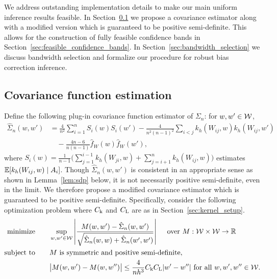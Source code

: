 We address outstanding implementation details to make our main uniform
inference results feasible. In Section~\ref{sec:covariance_estimation} we
propose a covariance estimator along with a modified version which is
guaranteed to be positive semi-definite. This allows for the construction of
fully feasible confidence bands in Section~\ref{sec:feasible_confidence_bands}.
In Section~\ref{sec:bandwidth_selection} we discuss bandwidth selection and
formalize our procedure for robust bias correction inference.

\subsection{Covariance function estimation}
\label{sec:covariance_estimation}

Define the following plug-in covariance function
estimator of $\Sigma_n$: for $w, w' \in \mathcal{W}$,
%
\begin{align*}
  \hat \Sigma_n(w,w')
  &= \frac{4}{n^2} \sum_{i=1}^n S_i(w) S_i(w')
  - \frac{4}{n^2(n-1)^2} \sum_{i<j} k_h(W_{i j},w) k_h(W_{i j},w') \\
  &\quad- \frac{4n-6}{n(n-1)} \hat f_W(w) \hat f_W(w'),
\end{align*}
%
where $S_i(w) = \frac{1}{n-1} \big( \sum_{j = 1}^{i-1} k_h(W_{j i}, w)
+ \sum_{j = i+1}^n k_h(W_{i j}, w) \big)$
estimates $\mathbb{E}[k_h(W_{i j},w) \mid A_i]$.
Though $\hat\Sigma_n(w,w')$ is consistent in an appropriate sense as shown in
Lemma~\ref{lem:sdp} below, it is not necessarily positive semi-definite, even
in the limit. We therefore propose a modified covariance estimator which is
guaranteed to be positive semi-definite. Specifically, consider the following
optimization problem where $C_{\mathrm{k}}$ and $C_{\mathrm{L}}$ are as in
Section~\ref{sec:kernel_setup}.
%
\begin{equation}
  \label{eq:sdp}
  \begin{aligned}
    \operatorname*{minimize}
    \qquad
    & \sup_{w,w' \in \mathcal{W}}
    \left|
    \frac{M(w,w') - \hat\Sigma_n(w,w')}
    {\sqrt{\hat \Sigma_n(w,w) + \hat \Sigma_n(w',w')}}
    \right|
    \quad \textup{ over } M: \mathcal{W} \times \mathcal{W} \to \mathbb{R}
    \\
    \operatorname*{subject\ to}
    \qquad
    & M \textup{ is symmetric and positive semi-definite}, \\
    & \big|M(w,w') - M(w, w'')\big|
    \leq \frac{4}{n h^3}
    C_{\mathrm{k}} C_{\mathrm{L}}
    |w'-w''|
    \textup{ for all }
    w, w', w'' \in \mathcal{W}.
  \end{aligned}
\end{equation}

